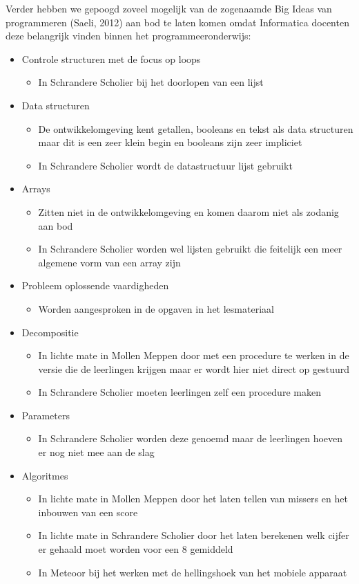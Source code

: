 \documentclass{BYUTextbook}
\begin{document}
Verder hebben we gepoogd zoveel mogelijk van de zogenaamde Big Ideas van programmeren (Saeli, 2012) aan bod te laten komen omdat Informatica docenten deze belangrijk vinden binnen het programmeeronderwijs:
\begin{itemize}
  \item Controle structuren met de focus op loops
    \begin{itemize}
      \item In Schrandere Scholier bij het doorlopen van een lijst
    \end{itemize}
  \item Data structuren
    \begin{itemize}
      \item De ontwikkelomgeving kent getallen, booleans en tekst als data structuren maar dit is een zeer klein begin en booleans zijn zeer impliciet
      \item In Schrandere Scholier wordt de datastructuur lijst gebruikt
    \end{itemize}
  \item Arrays
    \begin{itemize}
      \item Zitten niet in de ontwikkelomgeving en komen daarom niet als zodanig aan bod
      \item In Schrandere Scholier worden wel lijsten gebruikt die feitelijk een meer algemene vorm van een array zijn
    \end{itemize}
  \item Probleem oplossende vaardigheden
    \begin{itemize}
      \item Worden aangesproken in de opgaven in het lesmateriaal
    \end{itemize}
  \item Decompositie
    \begin{itemize}
      \item In lichte mate in Mollen Meppen door met een procedure te werken in de versie die de leerlingen krijgen maar er wordt hier niet direct op gestuurd
      \item In Schrandere Scholier moeten leerlingen zelf een procedure maken
    \end{itemize}
  \item Parameters
    \begin{itemize}
      \item In Schrandere Scholier worden deze genoemd maar de leerlingen hoeven er nog niet mee aan de slag
    \end{itemize}
  \item Algoritmes
    \begin{itemize}
      \item In lichte mate in Mollen Meppen door het laten tellen van missers en het inbouwen van een score
      \item In lichte mate in Schrandere Scholier door het laten berekenen welk cijfer er gehaald moet worden voor een 8 gemiddeld
      \item In Meteoor bij het werken met de hellingshoek van het mobiele apparaat
    \end{itemize}
\end{itemize}
    
\end{document}
